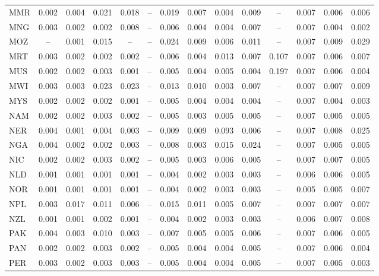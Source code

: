 \begin{longtable}{l*{13}{c}}
MMR & 0.002 & 0.004 & 0.021 & 0.018 & -- & 0.019 & 0.007 & 0.004 & 0.009 & -- & 0.007 & 0.006 & 0.006 \\
MNG & 0.003 & 0.002 & 0.002 & 0.008 & -- & 0.006 & 0.004 & 0.004 & 0.007 & -- & 0.007 & 0.004 & 0.002 \\
MOZ & -- & 0.001 & 0.015 & -- & -- & 0.024 & 0.009 & 0.006 & 0.011 & -- & 0.007 & 0.009 & 0.029 \\
MRT & 0.003 & 0.002 & 0.002 & 0.002 & -- & 0.006 & 0.004 & 0.013 & 0.007 & 0.107 & 0.007 & 0.006 & 0.007 \\
MUS & 0.002 & 0.002 & 0.003 & 0.001 & -- & 0.005 & 0.004 & 0.005 & 0.004 & 0.197 & 0.007 & 0.006 & 0.004 \\
MWI & 0.003 & 0.003 & 0.023 & 0.023 & -- & 0.013 & 0.010 & 0.003 & 0.007 & -- & 0.007 & 0.007 & 0.009 \\
MYS & 0.002 & 0.002 & 0.002 & 0.001 & -- & 0.005 & 0.004 & 0.004 & 0.004 & -- & 0.007 & 0.004 & 0.003 \\
NAM & 0.002 & 0.002 & 0.003 & 0.002 & -- & 0.005 & 0.003 & 0.005 & 0.005 & -- & 0.007 & 0.005 & 0.005 \\
NER & 0.004 & 0.001 & 0.004 & 0.003 & -- & 0.009 & 0.009 & 0.093 & 0.006 & -- & 0.007 & 0.008 & 0.025 \\
NGA & 0.004 & 0.002 & 0.002 & 0.003 & -- & 0.008 & 0.003 & 0.015 & 0.024 & -- & 0.007 & 0.005 & 0.005 \\
NIC & 0.002 & 0.002 & 0.003 & 0.002 & -- & 0.005 & 0.003 & 0.006 & 0.005 & -- & 0.007 & 0.007 & 0.005 \\
NLD & 0.001 & 0.001 & 0.001 & 0.001 & -- & 0.004 & 0.002 & 0.003 & 0.003 & -- & 0.006 & 0.006 & 0.005 \\
NOR & 0.001 & 0.001 & 0.001 & 0.001 & -- & 0.004 & 0.002 & 0.003 & 0.003 & -- & 0.005 & 0.005 & 0.007 \\
NPL & 0.003 & 0.017 & 0.011 & 0.006 & -- & 0.015 & 0.011 & 0.005 & 0.007 & -- & 0.007 & 0.007 & 0.007 \\
NZL & 0.001 & 0.001 & 0.002 & 0.001 & -- & 0.004 & 0.002 & 0.003 & 0.003 & -- & 0.006 & 0.007 & 0.008 \\
PAK & 0.004 & 0.003 & 0.010 & 0.003 & -- & 0.007 & 0.005 & 0.005 & 0.006 & -- & 0.007 & 0.006 & 0.005 \\
PAN & 0.002 & 0.002 & 0.003 & 0.002 & -- & 0.005 & 0.004 & 0.004 & 0.005 & -- & 0.007 & 0.006 & 0.004 \\
PER & 0.003 & 0.002 & 0.003 & 0.003 & -- & 0.005 & 0.004 & 0.004 & 0.005 & -- & 0.007 & 0.005 & 0.003 \\

\end{longtable}
